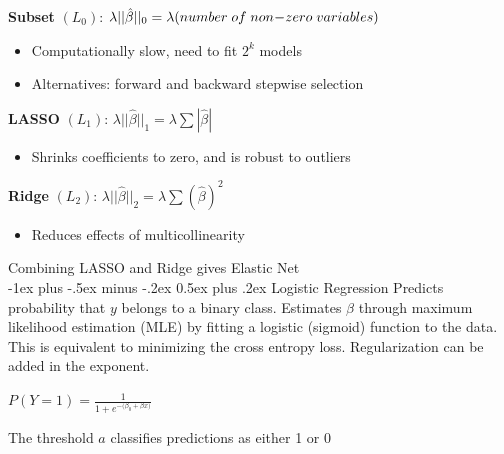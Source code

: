 \documentclass[10pt,landscape]{article}
\makeatletter
\renewcommand{\section}{\@startsection{section}{1}{0mm}%
                                {-1ex plus -.5ex minus -.2ex}%
                                {0.5ex plus .2ex}%
                                {\normalfont\large\bfseries}}
\makeatother
\begin{document}
\begin{multicols}{3}
    \textbf{Subset}  $(L_0)$: $\lambda ||\hat{\beta}||_0 = \lambda (number \;of\;non\hspace{-.7mm}-\hspace{-.7mm}zero\; variables)$
    \begin{itemize}[label={--},leftmargin=4mm]
        \vspace{-1mm}
        \itemsep -.4mm
        \item Computationally slow, need to fit $2^k$ models
        \item Alternatives: forward and backward stepwise selection
    \end{itemize}
    \textbf{LASSO} $(L_1)$: $\lambda ||\hat{\beta}||_1 = \lambda\sum | \hat{\beta} |$
    \begin{itemize}[label={--},leftmargin=4mm]
        \vspace{-1mm}
        \itemsep -.4mm
        \item Shrinks coefficients to zero, and is robust to outliers
    \end{itemize}
    \textbf{Ridge}  $(L_2)$: $\lambda ||\hat{\beta}||_2 = \lambda\sum( \hat{\beta})^2$
    \begin{itemize}[label={--},leftmargin=4mm]
        \vspace{-1mm}
        \itemsep -.4mm
        \item Reduces effects of multicollinearity
    \end{itemize}
    Combining LASSO and Ridge gives Elastic Net\\

    \section{Logistic Regression}
    Predicts probability that $y$ belongs to a binary class. Estimates $\beta$ through maximum likelihood estimation (MLE) by fitting a logistic (sigmoid) function to the data. This is equivalent to minimizing the cross entropy loss. Regularization can be added in the exponent.
    \vspace{-3mm}
    \begin{center}
        $\displaystyle P(Y=1) = \frac{1}{1 + e^{-({\beta_0} + {\beta x)}}}$

    \end{center}
    \vspace{-2mm}
    The threshold $a$ classifies predictions as either 1 or 0


\end{multicols}
\end{document}
